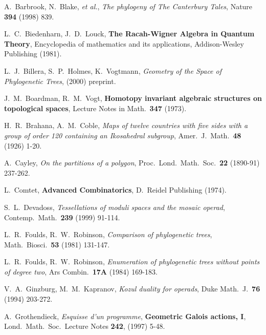 \documentclass[10pt]{amsart}
\begin{document}
\clearpage

%
%


\begin{thebibliography}{ADM9}
\baselineskip=12pt

 A.\ Barbrook, N.\ Blake, {\em et al.}, {\em The phylogeny of The Canterbury Tales}, Nature {\bf 394} (1998) 839.

 L.\ C.\ Biedenharn, J.\ D.\ Louck, {\bf The Racah-Wigner Algebra in Quantum Theory}, Encyclopedia of mathematics and its applications, Addison-Wesley Publishing (1981).


 L.\ J.\ Billera, S.\ P.\ Holmes, K.\ Vogtmann, {\em Geometry of the Space of Phylogenetic Trees}, (2000) preprint.

 J.\ M.\ Boardman, R.\ M.\ Vogt, {\bf Homotopy invariant algebraic structures on topological spaces}, Lecture Notes in Math.\ {\bf 347} (1973).


 H.\ R.\ Brahana, A.\ M.\ Coble, {\em Maps of twelve countries with five sides with a group of order 120 containing an Ikosahedral subgroup}, Amer.\ J.\ Math.\ {\bf 48} (1926) 1-20.

 A.\ Cayley, {\em On the partitions of a polygon}, Proc.\ Lond.\ Math.\ Soc.\ {\bf 22} (1890-91) 237-262.

 L.\ Comtet, {\bf Advanced Combinatorics}, D.\ Reidel Publishing (1974).

 S.\ L.\ Devadoss, {\em Tessellations of moduli spaces and the mosaic operad},  Contemp.\ Math.\ {\bf 239} (1999) 91-114.

 L.\ R.\ Foulds, R.\ W.\ Robinson, {\em Comparison of phylogenetic trees},  Math.\ Biosci.\ {\bf 53} (1981) 131-147.

 L.\ R.\ Foulds, R.\ W.\ Robinson, {\em Enumeration of phylogenetic trees without points of degree two},  Ars Combin.\ {\bf 17A} (1984) 169-183.

 V.\ A.\ Ginzburg, M.\ M.\ Kapranov, {\em Kozul duality for operads},  Duke Math.\ J.\ {\bf 76} (1994) 203-272.

 A.\ Grothendieck, {\em Esquisse d'un programme}, {\bf Geometric Galois actions, I}, Lond.\ Math.\ Soc.\ Lecture Notes {\bf 242}, (1997) 5-48.


\end{thebibliography}
\end{document}

